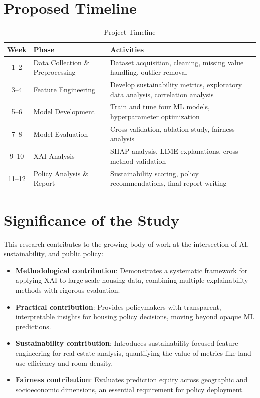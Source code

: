 \documentclass[12pt, a4paper]{article}
\begin{document}
\section{Proposed Timeline}

\begin{table}[H]
\centering
\caption{Project Timeline}
\begin{tabular}{clp{8cm}}
\toprule
\textbf{Week} & \textbf{Phase} & \textbf{Activities} \\
\midrule
1--2 & Data Collection \& Preprocessing & Dataset acquisition, cleaning, missing value handling, outlier removal \\
3--4 & Feature Engineering & Develop sustainability metrics, exploratory data analysis, correlation analysis \\
5--6 & Model Development & Train and tune four ML models, hyperparameter optimization \\
7--8 & Model Evaluation & Cross-validation, ablation study, fairness analysis \\
9--10 & XAI Analysis & SHAP analysis, LIME explanations, cross-method validation \\
11--12 & Policy Analysis \& Report & Sustainability scoring, policy recommendations, final report writing \\
\bottomrule
\end{tabular}
\end{table}

\section{Significance of the Study}

This research contributes to the growing body of work at the intersection of AI, sustainability, and public policy:

\begin{itemize}
    \item \textbf{Methodological contribution}: Demonstrates a systematic framework for applying XAI to large-scale housing data, combining multiple explainability methods with rigorous evaluation.
    
    \item \textbf{Practical contribution}: Provides policymakers with transparent, interpretable insights for housing policy decisions, moving beyond opaque ML predictions.
    
    \item \textbf{Sustainability contribution}: Introduces sustainability-focused feature engineering for real estate analysis, quantifying the value of metrics like land use efficiency and room density.
    
    \item \textbf{Fairness contribution}: Evaluates prediction equity across geographic and socioeconomic dimensions, an essential requirement for policy deployment.
\end{itemize}
\end{document}
